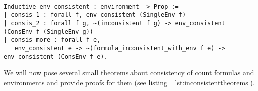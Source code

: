 \lstset{language=Coq}
\begin{lstlisting}[frame=single, caption={Inconsistent Environment}, label={lst:inconsistentenv}]

Inductive env_consistent : environment -> Prop :=
| consis_1 : forall f, env_consistent (SingleEnv f)
| consis_2 : forall f g, ~(inconsistent f g) -> env_consistent (ConsEnv f (SingleEnv g))
| consis_more : forall f e, 
   env_consistent e -> ~(formula_inconsistent_with_env f e) -> env_consistent (ConsEnv f e).

\end{lstlisting}


We will now pose several small theorems about consistency of count formulas and environments and provide proofs for them (see listing ~\ref{lst:inconsistenttheorems}).

\lstset{language=Coq}

